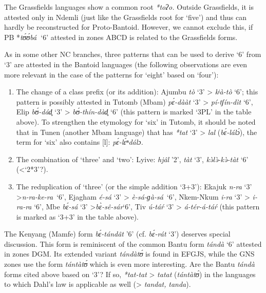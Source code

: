 The Grassfields languages show a common root \textit{*toʔo.} Outside Grassfields, it is attested only in Ndemli (just like the Grassfields root for `five') and thus can hardly be reconstructed for Proto-Bantoid. However, we cannot exclude this, if PB *\textit{t{\'{ʊ}}{\'{ʊ}}bá}\textbf{~}‘6’ attested in zones ABCD is related to the Grassfields forms.

As in some other NC branches, three patterns that can be used to derive `6' from `3' are attested in the Bantoid languages (the following observations are even more relevant in the case of the patterns for `eight' based on `four'):

\begin{enumerate}
\item The change of a class prefix (or its addition): Ajumbu \textit{tò} ‘3’ > \textit{kʲà-tò} ‘6’; this pattern is possibly attested in Tutomb (Mbam) \textit{p{\'{ɛ}}-dààt} ‘3’ > \textit{pí-tʃín-dìt} ‘6’, Elip \textit{b{\'{ʊ}}-dád̥} ‘3’ > \textit{b{\'{ʊ}}-thín-dàd̥} ‘6’ (this pattern is marked ‘3PL’ in the table above). To strengthen the etymology for `six' in Tutomb, it should be noted that in Tunen (another Mbam language) that has \textit{*tat} ‘3’ > \textit{lal} (\textit{b{\'{ɛ}}-lál{\'{ɔ}}}), the term for `six' also contains [l]: \textit{p{\'{ɛ}}-l{\'{ɛ}}ⁿdálɔ.}
\item The combination of `three' and `two': Lyive: \textit{hjâl} ’2’, \textit{tàt} ‘3’, \textit{k{\`{ə}}l{\`{ə}}-k{\`{ə}}-tàt} ‘6’ (<‘2*3’?).
\item The reduplication of `three' (or the simple addition ‘3+3’): Ekajuk \textit{n-ra} ‘3’ >\textit{n-ra-ke-ra}~‘6’, Ejagham \textit{é-sá} ‘3’ > \textit{è-sá-ɡà-sá}~‘6’, Nkem-Nkum \textit{i-ra} ‘3’ > \textit{i-ra-ra} ‘6’, Mbe \textit{b{\'{ɛ}}-sá} ‘3’ >\textit{b{\`{ɛ}}-s{\^{e}}-sár}‘6’, Tiv \textit{{\'{u}}-tá{\'{r}}} ‘3’ > \textit{á-tér-á-tá{\'{r}}} (this pattern is marked as ‘3+3’ in the table above). 
\end{enumerate}
The Kenyang (Mamfe) form \textit{b{\'{ɛ}}-tándât} ’6’ (cf. \textit{b{\'{ɛ}}-rát} ‘3’) deserves special discussion. This form is reminiscent of the common Bantu form \textit{tándà} ‘6’ attested in zones DGM. Its extended variant \textit{tándàt{\'{ʊ}}} is found in EFGJS, while the GNS zones use the form \textit{tántàt{\'{ʊ}}} which is even more interesting. Are the Bantu \textit{tándà} forms cited above based on `3'?  If so, \textit{*tat-tat} > \textit{tatat} (\textit{tántàt{\'{ʊ}}}) in the languages to which Dahl's law is applicable as well (> \textit{tandat,} \textit{tanda}).

